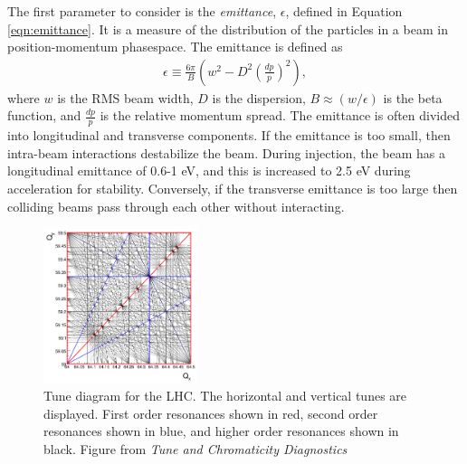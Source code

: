 The first parameter to consider is the \emph{emittance}, $\epsilon$, defined in Equation \ref{eqn:emittance}.
It is a measure of the distribution of the particles in a beam in position-momentum phasespace.
The emittance is defined as
\begin{equation}\begin{split}\label{eqn:emittance}
\epsilon \equiv \frac{6\pi}{B}\left(w^2-D^2\left(\frac{dp}{p}\right)^2\right),
\end{split}\end{equation} 
where $w$ is the RMS beam width, $D$ is the dispersion, $B\approx(w/\epsilon)$ is the beta function, and $\frac{dp}{p}$ is the relative momentum spread.
The emittance is often divided into longitudinal and transverse components.
If the emittance is too small, then intra-beam interactions destabilize the beam. 
During injection, the beam has a longitudinal emittance of 0.6-1 eV, and this is increased to 2.5 eV during acceleration for stability.
Conversely, if the transverse emittance is too large then colliding beams pass through each other without interacting.
\cite{boussard}\cite{lyndon}\cite{pdgAccelSection}

\begin{figure}[h!]
\captionsetup[subfigure]{position=b}
\centering
\includegraphics[width=0.4\textwidth]{figures/experiment/tune.png}
\caption{Tune diagram for the LHC. The horizontal and vertical tunes are displayed. First order resonances shown in red, second order resonances shown in blue, and higher order resonances shown in black. Figure from \emph{Tune and Chromaticity Diagnostics} \cite{steinhagen}}
\label{fig:tune}
\end{figure}

